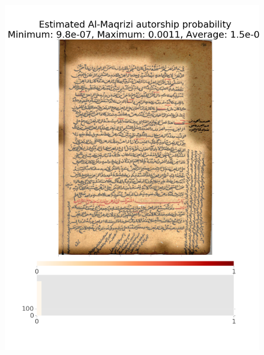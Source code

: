 \documentclass[conference,a4paper,twocolumn]{IEEEtran}
\begin{document}
\begin{figure}
\begin{minipage}{.45\linewidth}
  \includegraphics[width=\linewidth]{figures/sw_not_al_maqrisi.png}
  \label{img2}
\end{minipage}
\hspace{.05\linewidth}
\begin{minipage}{.45\linewidth}

\end{minipage}
\end{figure}
\end{document}
